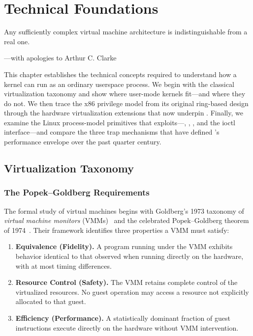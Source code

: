 
\chapter{Technical Foundations}
\label{ch:foundations}

\epigraph{Any sufficiently complex virtual machine architecture is
indistinguishable from a real one.}{---with apologies to Arthur C. Clarke}

This chapter establishes the technical concepts required to understand
how a kernel can run as an ordinary userspace process.  We begin with
the classical virtualization taxonomy and show where user-mode kernels
fit---and where they do not.  We then trace the x86 privilege model
from its original ring-based design through the hardware virtualization
extensions that now underpin \KVM{}.  Finally, we examine the Linux
process-model primitives that \UML{} exploits---,
\Seccomp{}, , and the \KVM{} ioctl interface---and compare
the three trap mechanisms that have defined \UML{}'s performance
envelope over the past quarter century.


\section{Virtualization Taxonomy}
\label{sec:foundations:taxonomy}

\subsection{The Popek--Goldberg Requirements}

The formal study of virtual machines begins with Goldberg's 1973
taxonomy of \emph{virtual machine monitors} (VMMs)~\cite{goldberg1973}
and the celebrated Popek--Goldberg theorem of 1974~\cite{popek1974}.
Their framework identifies three properties a VMM must satisfy:

\begin{enumerate}[label=\textbf{P\arabic*.},leftmargin=2.5em]
  \item \textbf{Equivalence (Fidelity).}
        A program running under the VMM exhibits behavior identical to
        that observed when running directly on the hardware, with at
        most timing differences.
  \item \textbf{Resource Control (Safety).}
        The VMM retains complete control of the virtualized resources.
        No guest operation may access a resource not explicitly
        allocated to that guest.
  \item \textbf{Efficiency (Performance).}
        A statistically dominant fraction of guest instructions execute
        directly on the hardware without VMM intervention.
\end{enumerate}

